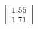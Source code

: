 \documentclass[preview]{standalone}
\begin{document}
\begin{align*}
\begin{bmatrix} 1.55 \\ 1.71 \end{bmatrix}
\end{align*}
\end{document}
